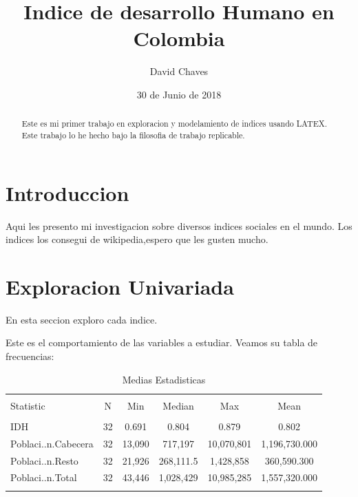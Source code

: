 \documentclass{article}
\title{Indice de desarrollo Humano en Colombia}
\author[]{\normalsize David Chaves}
\affil[,]{\small  Facultad de Ingenieria,\\ 

Universidad de los Andes\\
\texttt{{ld.chaves10}@uniandes.edu.co}}
\date{30 de Junio de 2018}
\begin{document}


\maketitle

\begin{abstract}


Este es mi primer trabajo en exploracion y modelamiento de indices usando LATEX. Este trabajo lo he hecho bajo la filosofia de trabajo replicable.

\end{abstract}


\section*{Introduccion}


Aqui les presento mi investigacion sobre diversos indices sociales en el mundo. Los indices los consegui de wikipedia,espero que les gusten mucho. 

\clearpage

\section{Exploracion Univariada}\label{univariada}

  En esta seccion exploro cada indice.

  Este es el comportamiento de las variables a estudiar.    Veamos su tabla de frecuencias:












\begin{table}[!htbp] \centering 
  \caption{Medias Estadisticas} 
  \label{Status} 
\begin{tabular}{@{\extracolsep{5pt}}lccccc} 
\\[-1.8ex]\hline 
\hline \\[-1.8ex] 
Statistic & \multicolumn{1}{c}{N} & \multicolumn{1}{c}{Min} & \multicolumn{1}{c}{Median} & \multicolumn{1}{c}{Max} & \multicolumn{1}{c}{Mean} \\ 
\hline \\[-1.8ex] 
IDH & 32 & 0.691 & 0.804 & 0.879 & 0.802 \\ 
Poblaci..n.Cabecera & 32 & 13,090 & 717,197 & 10,070,801 & 1,196,730.000 \\ 
Poblaci..n.Resto & 32 & 21,926 & 268,111.5 & 1,428,858 & 360,590.300 \\ 
Poblaci..n.Total & 32 & 43,446 & 1,028,429 & 10,985,285 & 1,557,320.000 \\ 
\hline \\[-1.8ex] 
\end{tabular} 
\end{table} 
\end{document}
